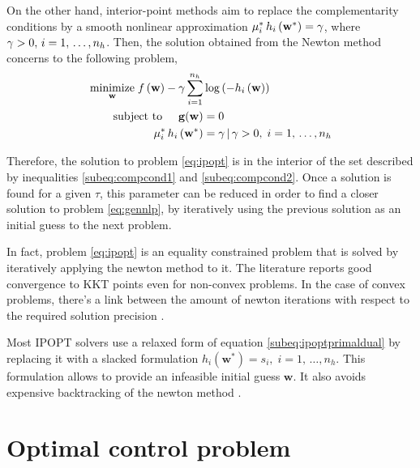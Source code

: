On the other hand, interior-point methods aim to replace the complementarity conditions by a smooth nonlinear approximation $\mu_i^* \, h_i\left( \mathbf{w}^*\right) = \gamma$, where $\gamma > 0,\, i = 1,\,\ldots,n_h$. Then, the solution obtained from the Newton method concerns to the following problem,
\begin{subequations}\label{eq:ipopt}
	\begin{align}
		\underset{\mathbf{w}}{\text{minimize}} \hspace{1mm} f\left(\mathbf{w}\right) - \gamma \sum_{i=1}^{n_h} &\log\left(-h_i\left( \mathbf{w}\right) \right) \label{subeq:ipoptobj}\\
		\text{subject to} \hspace{5mm} \mathbf{g}(\mathbf{w}) &= 0\label{subeq:ipoptg}\\
		\mu_i^* \, h_i\left( \mathbf{w}^*\right) &= \gamma \, | \,\gamma > 0,\;i = 1,\,\ldots,n_h \label{subeq:ipoptprimaldual}
	\end{align}
\end{subequations}

Therefore, the solution to problem \eqref{eq:ipopt} is in the interior of the set described by inequalities \eqref{subeq:compcond1} and \eqref{subeq:compcond2}. Once a solution is found for a given $\tau$, this parameter can be reduced in order to find a closer solution to problem \eqref{eq:gennlp}, by iteratively using the previous solution as an initial guess to the next problem.

In fact, problem \eqref{eq:ipopt} is an equality constrained problem that is solved by iteratively applying the newton method to it. The literature reports good convergence to KKT points even for non-convex problems. In the case of convex problems, there's a link between the amount of newton iterations with respect to the required solution precision \cite{diehlnumericalocp}.

\begin{remark}
Most IPOPT solvers use a relaxed form of equation \eqref{subeq:ipoptprimaldual} by replacing it with a slacked formulation $h_i\left( \mathbf{w}^*\right) = s_i,\;i = 1,\,\ldots,n_h$. This formulation allows to provide an infeasible initial guess $\mathbf{w}$. It also avoids expensive backtracking of the newton method \cite{diehlnumericalocp}.
\end{remark}

\section{Optimal control problem}
\label{section:optimalControlProblems}


